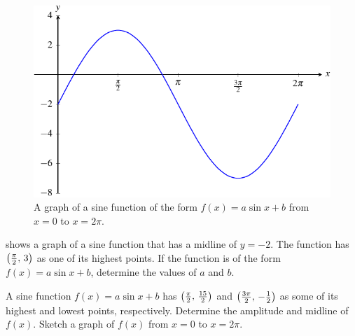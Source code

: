 \documentclass[a4paper,oneside,12pt]{article}
\begin{document}
\begin{figure}[!htbp]
\centering
\includegraphics[scale=1.1]{image/13/5-sin-minus2.pdf}
\caption{%
  A graph of a sine function of the form $f(x) = a \sin x + b$ from
  $x = 0$ to $x = 2\pi$.
}
\label{fig:trigonometric:5_sin_minus2}
\end{figure}

\begin{exercise}
 shows a graph of a sine
function that has a midline of $y = -2$.  The function has
$\left\lparen{\frac{\pi}{2}},\, {3}\right\rparen$ as one of its highest points.  If the
function is of the form $f(x) = a \sin x + b$, determine the values of
$a$ and $b$.
\end{exercise}


\begin{exercise}
A sine function $f(x) = a \sin x + b$ has
$\left\lparen{\frac{\pi}{2}},\, {\frac{15}{2}}\right\rparen$ and
$\left\lparen{\frac{3\pi}{2}},\, {-\frac{1}{2}}\right\rparen$ as some of its highest and
lowest points, respectively.  Determine the amplitude and midline of
$f(x)$.  Sketch a graph of $f(x)$ from $x = 0$ to $x = 2\pi$.
\end{exercise}
\end{document}
